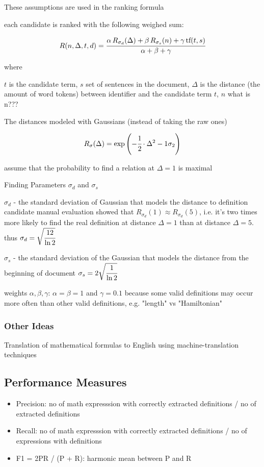 These assumptions are used in the ranking formula

each candidate is ranked with the following weighed sum:

$$R(n, \Delta, t, d) = \cfrac{\alpha \, R_{\sigma_d}(\Delta) + \beta \, R_{\sigma_s}(n) + \gamma \, \text{tf}(t, s)}{\alpha + \beta + \gamma}$$

where

$t$ is the candidate term,
$s$ set of sentences in the document,
$\Delta$ is the distance (the amount of word tokens) between identifier and the candidate term $t$,
$n$ what is n??? %

The distances modeled with Gaussians (instead of taking the raw ones)

$$R_{\sigma}(\Delta) = \exp \left( -\cfrac{1}{2} \cdot {\Delta^2 - 1}{\sigma_2} \right)$$

assume that the probability to find a relation at $\Delta = 1$ is maximal

Finding Parameters $\sigma_d$ and $\sigma_s$

$\sigma_d$ - the standard deviation of Gaussian that models the distance to definition candidate
manual evaluation showed that $R_{\sigma_d}(1) \approx R_{\sigma_d}(5)$,
i.e. it's two times more likely to find the real definition at distance $\Delta=1$ 
than at distance $\Delta=5$.
thus $\sigma_d = \sqrt{\cfrac{12}{\ln 2}}$


$\sigma_s$ - the standard deviation of the Gaussian that models the distance 
from the beginning of document
% 
$\sigma_s = 2 \sqrt{\cfrac{1}{\ln 2}}$


weights $\alpha, \beta, \gamma$:
$\alpha = \beta = 1$ and 
$\gamma = 0.1$ because some valid definitions may occur more often than other 
valid definitions, e.g. "length" vs "Hamiltonian"


\subsubsection{Other Ideas}
Translation of mathematical formulas to English using machine-translation techniques
\cite{nghiem2012towards}


\subsection{Performance Measures}

\begin{itemize}
  \item Precision: no of math expresssion with correctly extracted definitions / no of extracted definitions
  \item Recall: no of math expresssion with correctly extracted definitions / no of expressions with definitions
  \item F1 = 2PR / (P + R): harmonic mean between P and R
\end{itemize}
